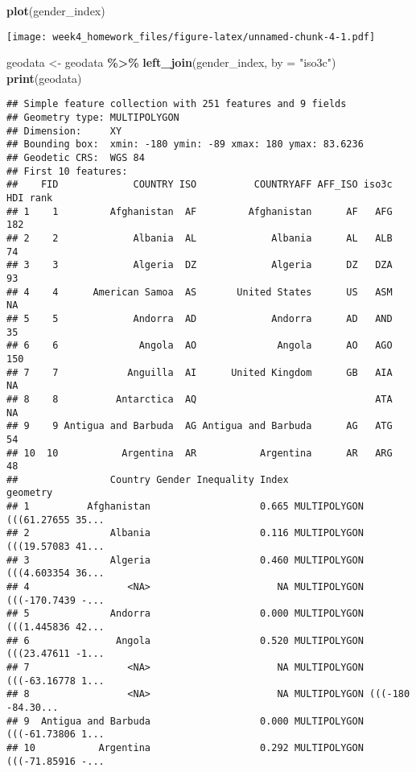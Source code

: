 \documentclass[
]{article}
\newenvironment{Shaded}{\begin{snugshade}}{\end{snugshade}}
\newcommand{\AttributeTok}[1]{\textcolor[rgb]{0.13,0.29,0.53}{#1}}
\newcommand{\FunctionTok}[1]{\textcolor[rgb]{0.13,0.29,0.53}{\textbf{#1}}}
\newcommand{\NormalTok}[1]{#1}
\newcommand{\OtherTok}[1]{\textcolor[rgb]{0.56,0.35,0.01}{#1}}
\newcommand{\SpecialCharTok}[1]{\textcolor[rgb]{0.81,0.36,0.00}{\textbf{#1}}}
\newcommand{\StringTok}[1]{\textcolor[rgb]{0.31,0.60,0.02}{#1}}
\begin{document}
\begin{Shaded}
\begin{Highlighting}[]
\FunctionTok{plot}\NormalTok{(gender\_index)}
\end{Highlighting}
\end{Shaded}

\texttt{[image: week4\_homework\_files/figure-latex/unnamed-chunk-4-1.pdf]}

\begin{Shaded}
\begin{Highlighting}[]
\NormalTok{geodata }\OtherTok{\textless{}{-}}\NormalTok{ geodata }\SpecialCharTok{\%\textgreater{}\%}
  \FunctionTok{left\_join}\NormalTok{(gender\_index, }\AttributeTok{by =} \StringTok{"iso3c"}\NormalTok{)}
\FunctionTok{print}\NormalTok{(geodata)}
\end{Highlighting}
\end{Shaded}

\begin{verbatim}
## Simple feature collection with 251 features and 9 fields
## Geometry type: MULTIPOLYGON
## Dimension:     XY
## Bounding box:  xmin: -180 ymin: -89 xmax: 180 ymax: 83.6236
## Geodetic CRS:  WGS 84
## First 10 features:
##    FID             COUNTRY ISO          COUNTRYAFF AFF_ISO iso3c HDI rank
## 1    1         Afghanistan  AF         Afghanistan      AF   AFG      182
## 2    2             Albania  AL             Albania      AL   ALB       74
## 3    3             Algeria  DZ             Algeria      DZ   DZA       93
## 4    4      American Samoa  AS       United States      US   ASM       NA
## 5    5             Andorra  AD             Andorra      AD   AND       35
## 6    6              Angola  AO              Angola      AO   AGO      150
## 7    7            Anguilla  AI      United Kingdom      GB   AIA       NA
## 8    8          Antarctica  AQ                               ATA       NA
## 9    9 Antigua and Barbuda  AG Antigua and Barbuda      AG   ATG       54
## 10  10           Argentina  AR           Argentina      AR   ARG       48
##                Country Gender Inequality Index                       geometry
## 1          Afghanistan                   0.665 MULTIPOLYGON (((61.27655 35...
## 2              Albania                   0.116 MULTIPOLYGON (((19.57083 41...
## 3              Algeria                   0.460 MULTIPOLYGON (((4.603354 36...
## 4                 <NA>                      NA MULTIPOLYGON (((-170.7439 -...
## 5              Andorra                   0.000 MULTIPOLYGON (((1.445836 42...
## 6               Angola                   0.520 MULTIPOLYGON (((23.47611 -1...
## 7                 <NA>                      NA MULTIPOLYGON (((-63.16778 1...
## 8                 <NA>                      NA MULTIPOLYGON (((-180 -84.30...
## 9  Antigua and Barbuda                   0.000 MULTIPOLYGON (((-61.73806 1...
## 10           Argentina                   0.292 MULTIPOLYGON (((-71.85916 -...
\end{verbatim}
\end{document}
